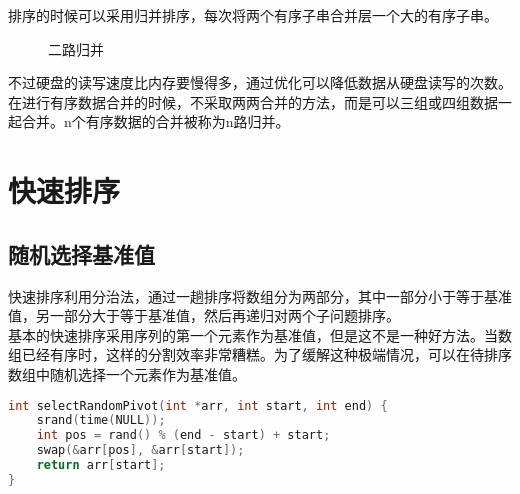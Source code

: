 排序的时候可以采用归并排序，每次将两个有序子串合并层一个大的有序子串。\\

\begin{figure}[H]
	\centering
	\caption{二路归并}
\end{figure}

不过硬盘的读写速度比内存要慢得多，通过优化可以降低数据从硬盘读写的次数。\\

在进行有序数据合并的时候，不采取两两合并的方法，而是可以三组或四组数据一起合并。n个有序数据的合并被称为n路归并。

\newpage

\section{快速排序}

\subsection{随机选择基准值}

快速排序利用分治法，通过一趟排序将数组分为两部分，其中一部分小于等于基准值，另一部分大于等于基准值，然后再递归对两个子问题排序。\\

基本的快速排序采用序列的第一个元素作为基准值，但是这不是一种好方法。当数组已经有序时，这样的分割效率非常糟糕。为了缓解这种极端情况，可以在待排序数组中随机选择一个元素作为基准值。\\


\begin{lstlisting}[language=C]
int selectRandomPivot(int *arr, int start, int end) {
    srand(time(NULL));
    int pos = rand() % (end - start) + start;
    swap(&arr[pos], &arr[start]);
    return arr[start];
}
\end{lstlisting}

\vspace{0.5cm}

